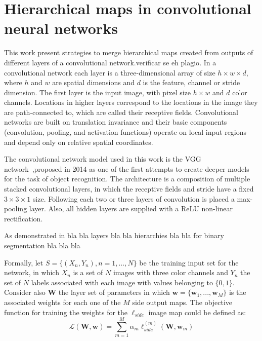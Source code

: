 \section{Hierarchical maps in convolutional neural networks}

This work present strategies to merge hierarchical maps created from  outputs of different layers of a convolutional network.{\color{green}verificar se eh plagio}. In a convolutional network each layer is a three-dimensional array of size $h \times w \times d$, where $h$ and $w$ are spatial dimensions  and $d$ is the feature, channel or stride dimension. The first layer is the input image, with pixel size $h \times w$ and $d$ color channels. Locations in higher layers correspond to the locations in the image they are path-connected to, which are called their receptive fields. Convolutional networks are built on translation invariance and their basic components (convolution, pooling, and activation functions) operate on local input regions and depend only on relative spatial coordinates. 

The convolutional network model used in this work is the VGG network~\cite{simonyan2014},proposed in 2014 as one of the first attempts to create deeper models for the task of object recognition. The architecture is a composition of multiple stacked convolutional layers, in which the receptive fields and stride have a fixed $3\times3\times1$ size. Following each two or three layers of convolution is placed a max-pooling layer. Also, all hidden layers are supplied with a ReLU non-linear rectification.

As demonstrated in bla bla layers bla bla hierarchies bla bla for binary segmentation bla bla bla

Formally, let $\mathit{S}=\{(\mathit{X_n,Y_n}), \mathit{n}=1,...,\mathit{N}\}$ be the training input set for the network, in which $\mathit{X_n}$ is a set of $\mathit{N}$ images with three color channels and $\mathit{Y_n}$ the set of $\mathit{N}$ labels associated with each image with values belonging to $\{0,1\}$. Consider also $\mathbf{W}$ the layer set of parameters in which
$\mathbf{w}=\{\mathbf{w}_1,...,\mathbf{w}_M\}$ is the associated weights for each one of the $\mathit{M}$ side output maps. The objective function for training the weights for the $\ell_{side}$ image map could be defined as:
\begin{equation}
\mathcal{L}(\mathbf{W},\mathbf{w})=\sum_{m=1}^M\alpha_m\ell_{side}^{(m)}(\mathbf{W},\mathbf{w}_m)
\end{equation}